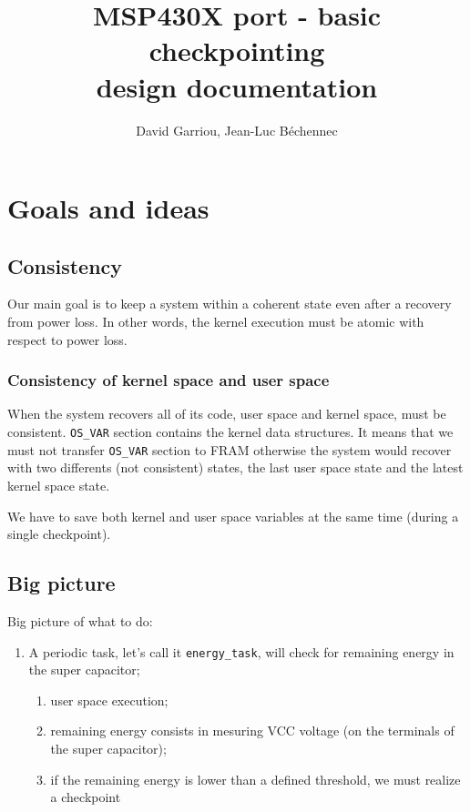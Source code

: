 \documentclass[11pt, oneside]{article}   	%
\title{MSP430X port - basic checkpointing\\design documentation}
\author{David Garriou, Jean-Luc Béchennec}
\begin{document}
\maketitle

\section{Goals and ideas}

\subsection{Consistency}
Our main goal is to keep a system within a coherent state even after a recovery from power loss.
In other words, the kernel execution must be atomic with respect to power loss.

\subsubsection{Consistency of kernel space and user space}

When the system recovers all of its code, user space and kernel space, must be consistent.
\lstinline{OS_VAR} section contains the kernel data structures.
It means that we must not transfer \lstinline{OS_VAR} section to FRAM otherwise the system would recover with two differents (not consistent) states, the last user space state and the latest kernel space state.

We have to save both kernel and user space variables at the same time (during a single checkpoint).

\subsection{Big picture}

Big picture of what to do:
\begin{enumerate}
\item A periodic task, let's call it \lstinline{energy_task}, will check for remaining energy in the super capacitor;
  \begin{enumerate}
  \item user space execution;
  \item remaining energy consists in mesuring VCC voltage (on the terminals of the super capacitor);
  \item if the remaining energy is lower than a defined threshold, we must realize a checkpoint
  \end{enumerate}
\end{enumerate}
\end{document}
